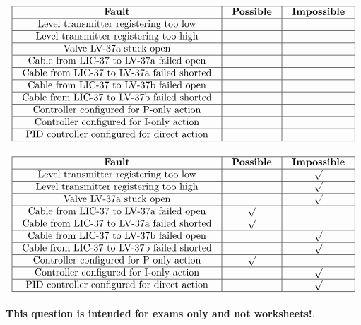 $$\vbox{\offinterlineskip
\halign{\strut
\vrule \quad\hfil # \ \hfil & 
\vrule \quad\hfil # \ \hfil & 
\vrule \quad\hfil # \ \hfil \vrule \cr
\noalign{\hrule}
%
{\bf Fault} & {\bf Possible} & {\bf Impossible} \cr
%
\noalign{\hrule}
%
Level transmitter registering too low &  & \cr
%
\noalign{\hrule}
%
Level transmitter registering too high &  & \cr
%
\noalign{\hrule}
%
Valve LV-37a stuck open &  &  \cr
%
\noalign{\hrule}
%
Cable from LIC-37 to LV-37a failed open &  & \cr
%
\noalign{\hrule}
%
Cable from LIC-37 to LV-37a failed shorted &  & \cr
%
\noalign{\hrule}
%
Cable from LIC-37 to LV-37b failed open &  & \cr
%
\noalign{\hrule}
%
Cable from LIC-37 to LV-37b failed shorted &  & \cr
%
\noalign{\hrule}
%
Controller configured for P-only action &  & \cr
%
\noalign{\hrule}
%
Controller configured for I-only action &  & \cr
%
\noalign{\hrule}
%
PID controller configured for direct action &  & \cr
%
\noalign{\hrule}
} %
}$$ %








$$\vbox{\offinterlineskip
\halign{\strut
\vrule \quad\hfil # \ \hfil & 
\vrule \quad\hfil # \ \hfil & 
\vrule \quad\hfil # \ \hfil \vrule \cr
\noalign{\hrule}
%
{\bf Fault} & {\bf Possible} & {\bf Impossible} \cr
%
\noalign{\hrule}
%
Level transmitter registering too low &  & $\surd$ \cr
%
\noalign{\hrule}
%
Level transmitter registering too high &  & $\surd$ \cr
%
\noalign{\hrule}
%
Valve LV-37a stuck open &  & $\surd$ \cr
%
\noalign{\hrule}
%
Cable from LIC-37 to LV-37a failed open & $\surd$  & \cr
%
\noalign{\hrule}
%
Cable from LIC-37 to LV-37a failed shorted & $\surd$  & \cr
%
\noalign{\hrule}
%
Cable from LIC-37 to LV-37b failed open &  & $\surd$ \cr
%
\noalign{\hrule}
%
Cable from LIC-37 to LV-37b failed shorted &  & $\surd$ \cr
%
\noalign{\hrule}
%
Controller configured for P-only action & $\surd$ & \cr
%
\noalign{\hrule}
%
Controller configured for I-only action &  & $\surd$ \cr
%
\noalign{\hrule}
%
PID controller configured for direct action &  & $\surd$ \cr
%
\noalign{\hrule}
} %
}$$ %








{\bf This question is intended for exams only and not worksheets!}.


